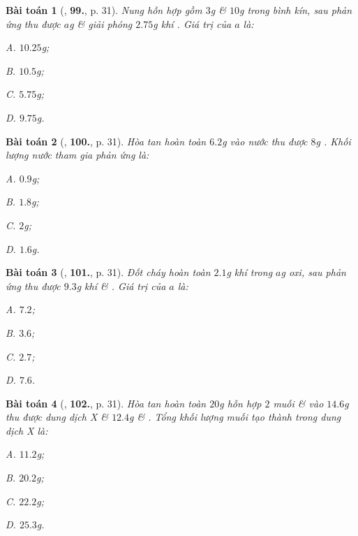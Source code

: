 \documentclass{article}
\numberwithin{equation}{section}
\newtheorem{baitoan}{Bài toán}[section]
\begin{document}
\begin{baitoan}[\cite{An2011}, \textbf{99.}, p. 31]
	Nung hỗn hợp gồm $3$g  \& $10$g  trong bình kín, sau phản ứng thu được $a$g  \& giải phóng $2.75$g khí . Giá trị của $a$ là:
	\begin{enumerate*}
		\item[{\rm\sf A.}] $10.25$g;
		\item[{\rm\sf B.}] $10.5$g;
		\item[{\rm\sf C.}] $5.75$g;
		\item[{\rm\sf D.}] $9.75$g.
	\end{enumerate*}
\end{baitoan}

\begin{baitoan}[\cite{An2011}, \textbf{100.}, p. 31]
	Hòa tan hoàn toàn $6.2$g  vào nước thu được $8$g . Khối lượng nước tham gia phản ứng là:
	\begin{enumerate*}
		\item[{\rm\sf A.}] $0.9$g;
		\item[{\rm\sf B.}] $1.8$g;
		\item[{\rm\sf C.}] $2$g;
		\item[{\rm\sf D.}] $1.6$g.
	\end{enumerate*}
\end{baitoan}

\begin{baitoan}[\cite{An2011}, \textbf{101.}, p. 31]
	Đốt cháy hoàn toàn $2.1$g khí  trong $a$g oxi, sau phản ứng thu được $9.3$g khí  \& . Giá trị của $a$ là:
	\begin{enumerate*}
		\item[{\rm\sf A.}] $7.2$;
		\item[{\rm\sf B.}] $3.6$;
		\item[{\rm\sf C.}] $2.7$;
		\item[{\rm\sf D.}] $7.6$.
	\end{enumerate*}
\end{baitoan}

\begin{baitoan}[\cite{An2011}, \textbf{102.}, p. 31]
	Hòa tan hoàn toàn $20$g hỗn hợp $2$ muối  \&  vào $14.6$g  thu được dung dịch X \& $12.4$g  \& . Tổng khối lượng muối tạo thành trong dung dịch X là:
	\begin{enumerate*}
		\item[{\rm\sf A.}] $11.2$g;
		\item[{\rm\sf B.}] $20.2$g;
		\item[{\rm\sf C.}] $22.2$g;
		\item[{\rm\sf D.}] $25.3$g.
	\end{enumerate*}
\end{baitoan}
\end{document}
